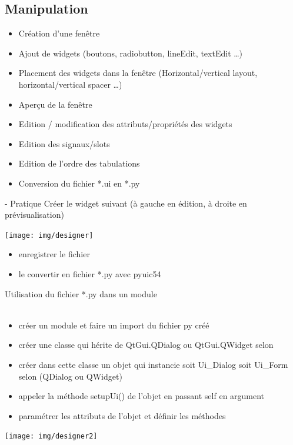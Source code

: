 \documentclass[9pt, french, brown]{beamer}
\newcommand{\mytitle}[1]{{\color{brown}#1 \\~\\}}
\begin{document}
\subsection{Manipulation} 
\begin{frame}{\secname}{\subsecname}
\begin{itemize}
\item Création d\rq{}une fenêtre
\item Ajout de widgets (boutons, radiobutton, lineEdit, textEdit \ldots)
\item Placement des widgets dans la fenêtre (Horizontal/vertical layout, horizontal/vertical spacer \ldots)
\item Aperçu de la fenêtre
\item Edition / modification des attributs/propriétés des widgets
\item Edition des signaux/slots
\item Edition de l\rq{}ordre des tabulations
\item Conversion du fichier *.ui en *.py
\end{itemize}
\end{frame}

\begin{frame}{\secname}{\subsecname{} - Pratique}
Créer le widget suivant (à gauche en édition, à droite en prévisualisation)
\begin{center}\texttt{[image: img/designer]}\end{center}
\begin{itemize}
\item enregistrer le fichier 
\item le convertir en fichier *.py avec pyuic54
\end{itemize}
\end{frame}

\begin{frame}{\secname}{\subsecname{}}
\mytitle{Utilisation du fichier *.py dans un module}
\begin{itemize}
\item créer un module et faire un import du fichier py créé 
\item créer une classe qui hérite de QtGui.QDialog ou QtGui.QWidget selon
\item créer dans cette classe un objet qui instancie soit Ui\_Dialog soit Ui\_Form selon (QDialog ou QWidget)
\item appeler la méthode setupUi() de l'objet en passant self en argument
\item paramétrer les attributs de l'objet et définir les méthodes
\end{itemize}
\begin{center}\texttt{[image: img/designer2]}\end{center}
\end{frame}
\end{document}
